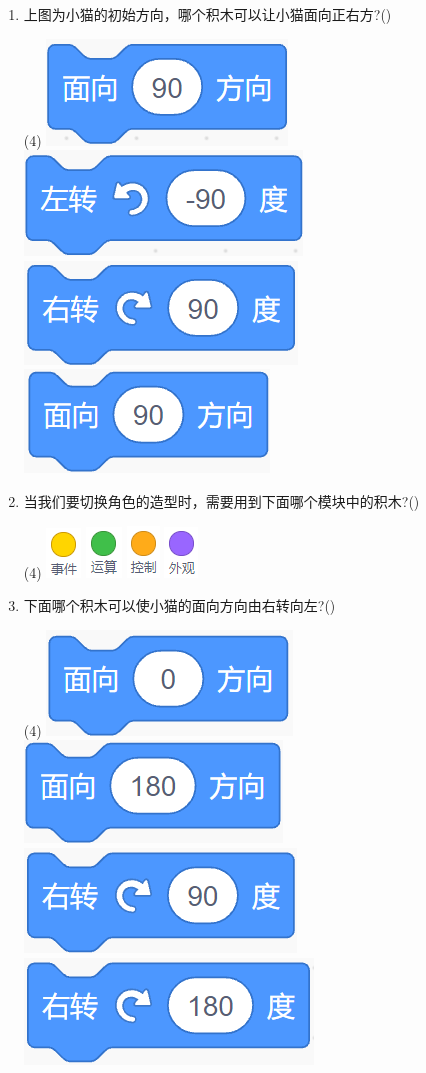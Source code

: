 \documentclass[10pt, a4paper]{article}
\begin{document}
\begin{enumerate}
        \item 上图为小猫的初始方向，哪个积木可以让小猫面向正右方?(\qquad)
        \begin{tasks}(4)
            \task \includegraphics[width=.1\textwidth]{4a.png}
            \task \includegraphics[width=.12\textwidth]{4b.png}
            \task \includegraphics[width=.12\textwidth]{4c.png}
            \task \includegraphics[width=.12\textwidth]{4d.png}
        \end{tasks}

        \item 当我们要切换角色的造型时，需要用到下面哪个模块中的积木?(\qquad)
        \begin{tasks}(4)
            \task \includegraphics[width=.03\textwidth]{5a.png}
            \task \includegraphics[width=.03\textwidth]{5b.png}
            \task \includegraphics[width=.03\textwidth]{5c.png}
            \task \includegraphics[width=.03\textwidth]{5d.png}
        \end{tasks}

        \item 下面哪个积木可以使小猫的面向方向由右转向左?(\qquad)
        \begin{tasks}(4)
            \task \includegraphics[width=.12\textwidth]{6a.png}
            \task \includegraphics[width=.12\textwidth]{6b.png}
            \task \includegraphics[width=.12\textwidth]{6c.png}
            \task \includegraphics[width=.12\textwidth]{6d.png}
        \end{tasks}


\end{enumerate}
\end{document}
